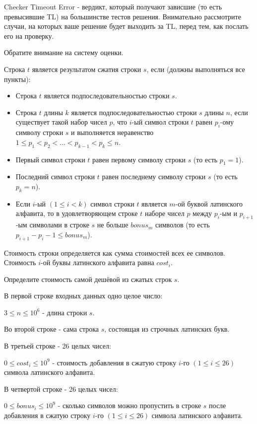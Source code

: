 
Checker Timeout Error - вердикт, который получают зависшие (то есть превысившие TL) на большинстве тестов решения. 
Внимательно рассмотрите случаи, на которых ваше решение будет выходить за TL, перед тем, как послать его на проверку.

Обратите внимание на систему оценки.

Строка $t$ является результатом сжатия строки $s$, если (должны выполняться все пункты):
\begin{itemize}
    \item Строка $t$ является подпоследовательностью строки $s$.
    \item Строка $t$ длины $k$ является подпоследовательностью строки $s$ длины $n$, если существует такой набор чисел $p$, что $i$-ый символ строки $t$ равен 
    $p_{i}$-ому символу строки $s$ и выполняется неравенство $1 \leq p_{1} < p_{2} < ... < p_{k-1} < p_{k} \leq n$.
    \item Первый символ строки $t$ равен первому символу строки $s$ (то есть $p_{1} = 1$).
    \item Последний символ строки $t$ равен последнему символу строки $s$ (то есть $p_{k} = n$).
    \item Если $i$-ый $(1 \leq i < k)$ символ строки $t$ является $m$-ой буквой латинского алфавита, то в удовлетворяющем строке $t$ наборе чисел $p$ между $p_i$-ым и 
    $p_{i+1}$-ым символами в строке $s$ не больше $bonus_m$ символов (то есть $p_{i+1}-p_{i} - 1 \leq bonus_m$).   
\end{itemize}

Стоимость строки определяется как сумма стоимостей всех ее символов. Стоимость $i$-ой буквы латинского алфавита равна $cost_{i}$.

Определите стоимость самой дешёвой из сжатых строк $s$.

В первой строке входных данных одно целое число: 

$3 \le n \le 10^{6}$ - длина строки $s$.

Во второй строке - сама строка $s$, состоящая из строчных латинских букв.

В третьей строке - 26 целых чисел:

$0 \le cost_{i} \le 10^{9}$ - стоимость добавления в сжатую строку $i$-го $(1 \le i \le 26)$ символа латинского алфавита.

В четвертой строке - 26 целых чисел:

$0 \le bonus_{i} \le 10^{9}$ - сколько символов можно пропустить в строке $s$ после добавления в сжатую строку $i$-го 
$(1 \le i \le 26)$ символа латинского алфавита.

